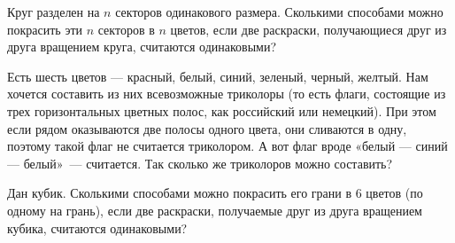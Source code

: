﻿
\begin{enumerate}
\itA Круг разделен на $n$ секторов одинакового размера. Сколькими способами можно покрасить эти $n$ секторов в $n$ цветов, если две раскраски, получающиеся друг из друга вращением круга, считаются одинаковыми?

\itB Есть шесть цветов — красный, белый, синий, зеленый, черный, желтый. Нам хочется составить из них всевозможные триколоры (то есть флаги, состоящие из трех горизонтальных цветных полос, как российский или немецкий). При этом если рядом оказываются две полосы одного цвета, они сливаются в одну, поэтому такой флаг не считается триколором. А вот флаг вроде «белый — синий — белый»~— считается. Так сколько же триколоров можно составить?

\itC Дан кубик. Сколькими способами можно покрасить его грани в 6 цветов (по одному на грань), если две раскраски, получаемые друг из друга вращением кубика, считаются одинаковыми?
\end{enumerate}